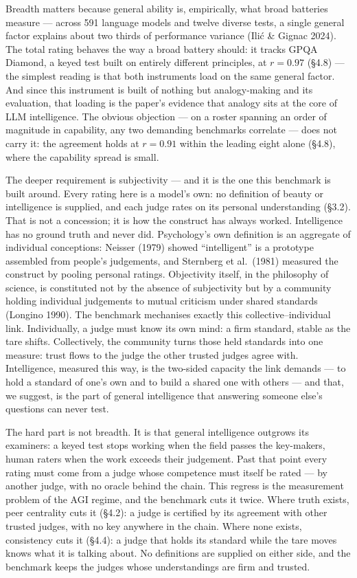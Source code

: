 Breadth matters because general ability is, empirically, what broad batteries measure --- across 591 language models and twelve diverse tests, a single general factor explains about two thirds of performance variance (Ilić \& Gignac 2024). The total rating behaves the way a broad battery should: it tracks GPQA Diamond, a keyed test built on entirely different principles, at \(r = 0.97\) (§4.8) --- the simplest reading is that both instruments load on the same general factor. And since this instrument is built of nothing but analogy-making and its evaluation, that loading is the paper's evidence that analogy sits at the core of LLM intelligence. The obvious objection --- on a roster spanning an order of magnitude in capability, any two demanding benchmarks correlate --- does not carry it: the agreement holds at \(r = 0.91\) within the leading eight alone (§4.8), where the capability spread is small.

The deeper requirement is subjectivity --- and it is the one this benchmark is built around. Every rating here is a model's own: no definition of beauty or intelligence is supplied, and each judge rates on its personal understanding (§3.2). That is not a concession; it is how the construct has always worked. Intelligence has no ground truth and never did. Psychology's own definition is an aggregate of individual conceptions: Neisser (1979) showed ``intelligent'' is a prototype assembled from people's judgements, and Sternberg et al.~(1981) measured the construct by pooling personal ratings. Objectivity itself, in the philosophy of science, is constituted not by the absence of subjectivity but by a community holding individual judgements to mutual criticism under shared standards (Longino 1990). The benchmark mechanises exactly this collective--individual link. Individually, a judge must know its own mind: a firm standard, stable as the tare shifts. Collectively, the community turns those held standards into one measure: trust flows to the judge the other trusted judges agree with. Intelligence, measured this way, is the two-sided capacity the link demands --- to hold a standard of one's own and to build a shared one with others --- and that, we suggest, is the part of general intelligence that answering someone else's questions can never test.

The hard part is not breadth. It is that general intelligence outgrows its examiners: a keyed test stops working when the field passes the key-makers, human raters when the work exceeds their judgement. Past that point every rating must come from a judge whose competence must itself be rated --- by another judge, with no oracle behind the chain. This regress is the measurement problem of the AGI regime, and the benchmark cuts it twice. Where truth exists, peer centrality cuts it (§4.2): a judge is certified by its agreement with other trusted judges, with no key anywhere in the chain. Where none exists, consistency cuts it (§4.4): a judge that holds its standard while the tare moves knows what it is talking about. No definitions are supplied on either side, and the benchmark keeps the judges whose understandings are firm and trusted.

